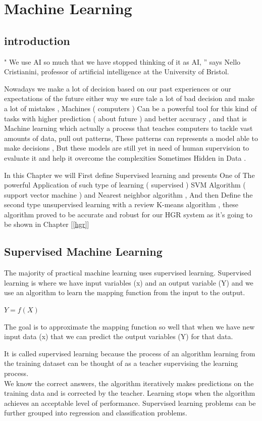 
\chapter{Machine Learning} \label{ML}

\section{introduction}

" We use AI so much that we have stopped thinking of it as AI, ”  says Nello Cristianini,  professor of artificial  intelligence at the University of Bristol.

Nowadays we make a lot of decision based on our past experiences  or our expectations of the future either way we sure tale  a lot of bad decision and make a lot of mistakes , Machines ( computers ) Can be a powerful tool for this kind of tasks with higher prediction ( about future )  and better accuracy , and that is Machine learning which actually a process  that teaches computers to tackle vast amounts of data, pull out patterns, These patterns can represents a model able to  make decisions , But these models are still yet in need of human supervision to evaluate it and help it overcome the complexities Sometimes Hidden in Data .

In this Chapter we will First define Supervised learning and presents One of The powerful Application of such type of learning ( supervised ) SVM Algorithm ( support vector machine )  and Nearest neighbor algorithm , And then Define the second type unsupervised learning   with a review K-means algorithm , these algorithm  proved  to be accurate and robust  for our HGR system as it's going to be shown in  Chapter  [\ref{hgr}]

\section{Supervised Machine Learning}

The majority of practical machine learning uses supervised learning.
Supervised learning is where we have input variables (x) and an output variable (Y) and we use an algorithm to learn the mapping function from the input to the output.

$Y = f(X)$

The goal is to approximate the mapping function so well that when we have new input data (x) that we can predict the output variables (Y) for that data.

It is called supervised learning because the process of an algorithm learning from the training dataset can be thought of as a teacher supervising the learning process.\\ We know the correct answers, the algorithm iteratively makes predictions on the training data and is corrected by the teacher. Learning stops when the algorithm achieves an acceptable level of performance.
Supervised learning problems can be further grouped into regression and classification problems.

